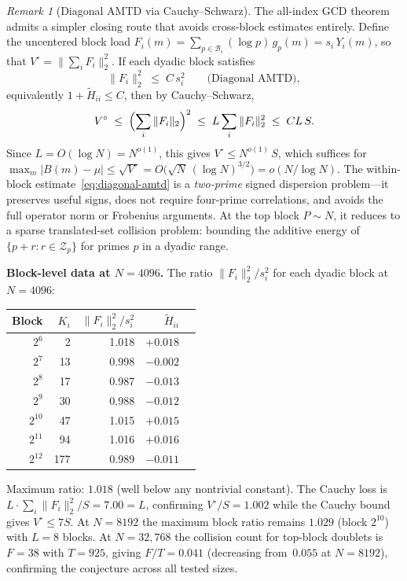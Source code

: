 \documentclass[11pt]{article}
\theoremstyle{definition}
\theoremstyle{remark}
\newtheorem{remark}[theorem]{Remark}
\begin{document}
\begin{remark}[Diagonal AMTD via Cauchy--Schwarz]
\label{rem:diagonal-amtd}
The all-index GCD theorem admits a simpler
closing route that avoids cross-block estimates entirely.
Define the uncentered block load
$F_i(m) = \sum_{p \in \mathcal{B}_i} (\log p)\,g_p(m)
= s_i\,Y_i(m)$, so that
$V^\circ = \|\sum_i F_i\|_2^2$.
If each dyadic block satisfies
\begin{equation}\label{eq:diagonal-amtd}
  \|F_i\|_2^2 \;\le\; C\,s_i^2
  \qquad\text{(Diagonal AMTD)},
\end{equation}
equivalently $1 + \tilde{H}_{ii} \le C$,
then by Cauchy--Schwarz,
\[
  V^\circ
  \;\le\;
  \Bigl(\sum_i \|F_i\|_2\Bigr)^2
  \;\le\;
  L \sum_i \|F_i\|_2^2
  \;\le\;
  CL\,S.
\]
Since $L = O(\log N) = N^{o(1)}$, this gives
$V^\circ \le N^{o(1)}\,S$, which suffices for
$\max_m |B(m) - \mu| \le \sqrt{V^\circ}
= O\bigl(\sqrt{N}\,(\log N)^{3/2}\bigr) = o(N/\log N)$.
The within-block estimate~\eqref{eq:diagonal-amtd}
is a \emph{two-prime} signed dispersion problem---it
preserves useful signs, does not require
four-prime correlations, and avoids the full
operator norm or Frobenius arguments.
At the top block $P \sim N$, it reduces to
a sparse translated-set collision problem:
bounding the additive energy of
$\{p + r : r \in \mathcal{Z}_p\}$
for primes $p$ in a dyadic range.

\medskip
\noindent\textbf{Block-level data at $N = 4096$.}
The ratio $\|F_i\|_2^2/s_i^2$ for each
dyadic block at $N = 4096$:

\smallskip
\begin{center}
\begin{tabular}{rrrrr}
\toprule
Block & $K_i$ & $\|F_i\|_2^2/s_i^2$ & $\tilde{H}_{ii}$ \\
\midrule
$2^6$  & 2   & 1.018 & $+0.018$ \\
$2^7$  & 13  & 0.998 & $-0.002$ \\
$2^8$  & 17  & 0.987 & $-0.013$ \\
$2^9$  & 30  & 0.988 & $-0.012$ \\
$2^{10}$ & 47 & 1.015 & $+0.015$ \\
$2^{11}$ & 94 & 1.016 & $+0.016$ \\
$2^{12}$ & 177 & 0.989 & $-0.011$ \\
\bottomrule
\end{tabular}
\end{center}
\smallskip
\noindent
Maximum ratio: $1.018$
(well below any nontrivial constant).
The Cauchy loss is $L \cdot \sum_i \|F_i\|_2^2
/ S = 7.00 = L$, confirming
$V^\circ/S = 1.002$ while the
Cauchy bound gives $V^\circ \le 7S$.
At $N = 8192$ the maximum block ratio
remains $1.029$ (block $2^{10}$)
with $L = 8$ blocks.
At $N = 32{,}768$ the collision count
for top-block doublets is $F = 38$
with $T = 925$, giving $F/T = 0.041$
(decreasing from~$0.055$ at $N = 8192$),
confirming the conjecture across all tested sizes.
\end{remark}
\end{document}

